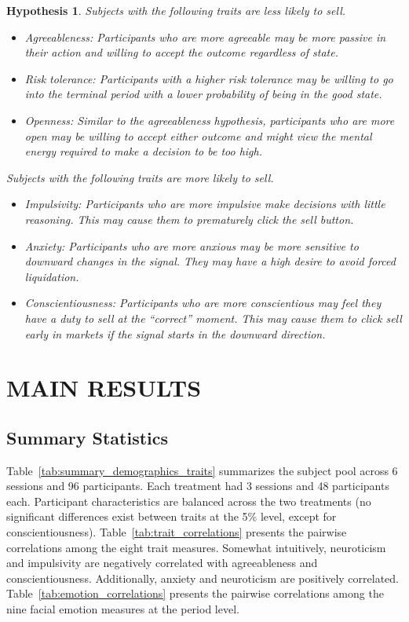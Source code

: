 \documentclass[thesis]{uathesis}
\newtheorem{hypothesis}{Hypothesis}
\begin{document}
\begin{body}
\begin{hypothesis}\label{hyp:traits}
    Subjects with the following traits are less likely to sell.
    \begin{itemize}
        \item Agreeableness: Participants who are more agreeable may be more passive in their action and willing to accept the outcome regardless of state.
        \item Risk tolerance: Participants with a higher risk tolerance may be willing to go into the terminal period with a lower probability of being in the good state.
        \item Openness: Similar to the agreeableness hypothesis, participants who are more open may be willing to accept either outcome and might view the mental energy required to make a decision to be too high.
    \end{itemize}
    Subjects with the following traits are more likely to sell.
    \begin{itemize}
        \item Impulsivity: Participants who are more impulsive make decisions with little reasoning. This may cause them to prematurely click the sell button.
        \item Anxiety: Participants who are more anxious may be more sensitive to downward changes in the signal. They may have a high desire to avoid forced liquidation.
        \item Conscientiousness: Participants who are more conscientious may feel they have a duty to sell at the ``correct'' moment. This may cause them to click sell early in markets if the signal starts in the downward direction.
    \end{itemize}
\end{hypothesis}

\chapter{MAIN RESULTS}

\section{Summary Statistics}

Table~\ref{tab:summary_demographics_traits} summarizes the subject pool across 6 sessions and 96 participants. Each treatment had 3 sessions and 48 participants each. Participant characteristics are balanced across the two treatments (no significant differences exist between traits at the 5\% level, except for conscientiousness). Table~\ref{tab:trait_correlations} presents the pairwise correlations among the eight trait measures. Somewhat intuitively, neuroticism and impulsivity  are negatively correlated with agreeableness and conscientiousness. Additionally, anxiety and neuroticism are positively correlated. Table~\ref{tab:emotion_correlations} presents the pairwise correlations among the nine facial emotion measures at the period level.



\end{body}
\end{document}
